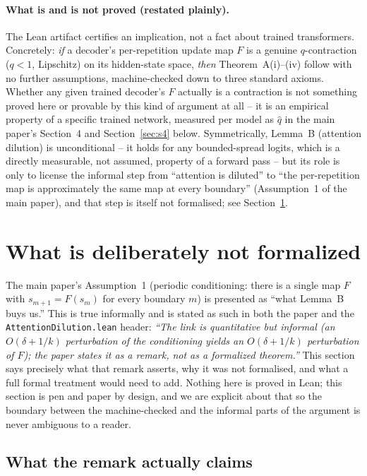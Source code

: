 \documentclass[11pt]{article}
\begin{document}
\paragraph{What is and is not proved (restated plainly).} The Lean artifact
certifies an implication, not a fact about trained transformers.
Concretely: \emph{if} a decoder's per-repetition update map $F$ is a genuine
$q$-contraction ($q<1$, Lipschitz) on its hidden-state space, \emph{then}
Theorem~A(i)--(iv) follow with no further assumptions, machine-checked down to
three standard axioms. Whether any given trained decoder's $F$ actually is a
contraction is not something proved here or provable by this kind of
argument at all -- it is an empirical property of a specific trained network,
measured per model as $\hat q$ in the main paper's Section~4 and
Section~\ref{sec:s4} below. Symmetrically, Lemma~B (attention dilution) is
unconditional -- it holds for any bounded-spread logits, which is a directly
measurable, not assumed, property of a forward pass -- but its role is only to
license the informal step from ``attention is diluted'' to ``the
per-repetition map is approximately the same map at every boundary''
(Assumption~1 of the main paper), and that step is itself not formalised; see
Section~\ref{sec:s2}.

\section{What is deliberately not formalized}
\label{sec:s2}

The main paper's Assumption~1 (periodic conditioning: there is a single map
$F$ with $s_{m+1}=F(s_m)$ for every boundary $m$) is presented as ``what
Lemma~B buys us.'' This is true informally and is stated as such in both the
paper and the \texttt{AttentionDilution.lean} header: \emph{``The link is
quantitative but informal (an $O(\delta+1/k)$ perturbation of the conditioning
yields an $O(\delta+1/k)$ perturbation of $F$); the paper states it as a
remark, not as a formalized theorem.''} This section says precisely what that
remark asserts, why it was not formalised, and what a full formal treatment
would need to add. Nothing here is proved in Lean; this section is pen and
paper by design, and we are explicit about that so the boundary between the
machine-checked and the informal parts of the argument is never ambiguous to
a reader.

\subsection{What the remark actually claims}
\end{document}
